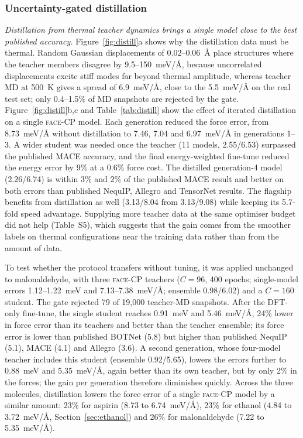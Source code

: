 \documentclass[journal=jctcce,manuscript=article,layout=traditional]{achemso}
\newcommand{\FACE}{\textup{\textsc{face}}}
\begin{document}
\subsubsection{Uncertainty-gated distillation}
\label{sec:distillresults}
\emph{Distillation from thermal teacher dynamics brings a single model close to the best published accuracy.}
Figure~\ref{fig:distill}a shows why the distillation data must be thermal. Random Gaussian displacements of
0.02--0.06~\AA{} place structures where the teacher members disagree by 9.5--150~meV/\AA, because uncorrelated
displacements excite stiff modes far beyond thermal amplitude, whereas teacher MD at 500~K gives a spread of
6.9~meV/\AA, close to the 5.5~meV/\AA{} on the real test set; only 0.4--1.5\% of MD snapshots are rejected by the gate.
Figure~\ref{fig:distill}b,c and Table~\ref{tab:distill} show the effect of iterated distillation on a single \FACE-CP
model. Each generation reduced the force error, from 8.73~meV/\AA{} without distillation to 7.46, 7.04 and
6.97~meV/\AA{} in generations 1--3. A wider student was needed once the teacher (11 models, 2.55/6.53) surpassed the
published MACE accuracy, and the final energy-weighted fine-tune reduced the energy error by 9\% at a 0.6\% force
cost. The distilled generation-4 model (2.26/6.74) is within 3\% and 2\% of the published MACE result and better on
both errors than published NequIP, Allegro and TensorNet results. The flagship benefits from distillation as well
(3.13/8.04 from 3.13/9.08) while keeping its 5.7-fold speed advantage. Supplying more teacher data at the same
optimiser budget did not help (Table~S5), which suggests that the gain comes from the smoother labels on thermal
configurations near the training data rather than from the amount of data.

To test whether the protocol transfers without tuning, it was applied unchanged to malonaldehyde, with three
\FACE-CP teachers ($C=96$, 400 epochs; single-model errors 1.12--1.22~meV and 7.13--7.38~meV/\AA; ensemble 0.98/6.02)
and a $C=160$ student. The gate rejected 79 of 19,000 teacher-MD snapshots. After the DFT-only fine-tune, the single
student reaches 0.91~meV and 5.46~meV/\AA, 24\% lower in force error than its teachers and better than the teacher
ensemble; its force error is lower than published BOTNet (5.8) but higher than published NequIP (5.1), MACE (4.1) and
Allegro (3.6)\cite{batatia2022mace,musaelian2023}. A second generation, whose four-model teacher includes this
student (ensemble 0.92/5.65), lowers the errors further to 0.88~meV and 5.35~meV/\AA, again better than its own
teacher, but by only 2\% in the forces; the gain per generation therefore diminishes quickly. Across the three
molecules, distillation lowers the force error of a single \FACE-CP model by a similar amount: 23\% for aspirin (8.73
to 6.74~meV/\AA), 23\% for ethanol (4.84 to 3.72~meV/\AA, Section~\ref{sec:ethanol}) and 26\% for malonaldehyde
(7.22 to 5.35~meV/\AA).
\end{document}
